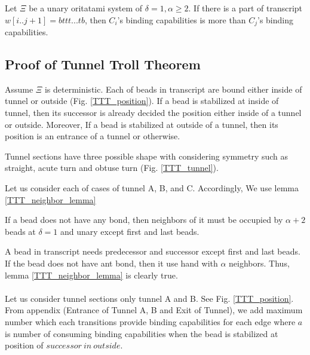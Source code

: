 \documentclass[runningheads]{llncs}
\begin{document}
\begin{theorem}
  Let $\Xi$ be a unary oritatami system of $\delta = 1, \alpha \geq 2$. If there is a part of transcript $w[i..j+1] = bttt...tb$, then $C_i$'s binding capabilities is more than $C_j$'s binding capabilities.
\end{theorem}



\subsection{Proof of Tunnel Troll Theorem}
Assume $\Xi$ is deterministic. %
Each of beads in transcript are bound either inside of tunnel or outside (Fig. \ref{TTT_position}). If a bead is stabilized at inside of tunnel, then its successor is already decided the position either inside of a tunnel or outside. Moreover, If a bead is stabilized at outside of a tunnel, then its position is an entrance of a tunnel or otherwise.

Tunnel sections have three possible shape with considering symmetry such as straight, acute turn and obtuse turn (Fig. \ref{TTT_tunnel}). %

Let us consider each of cases of tunnel A, B, and C. Accordingly, We use lemma \ref{TTT_neighbor_lemma}

\begin{lemma}
\label{TTT_neighbor_lemma}
If a bead does not have any bond, then neighbors of it must be occupied by $\alpha + 2$ beads at $\delta = 1$ and unary except first and last beads.
\end{lemma}

A bead in transcript needs predecessor and successor except first and last beads. If the bead does not have ant bond, then it use hand with $\alpha$ neighbors. Thus, lemma \ref{TTT_neighbor_lemma} is clearly true.

\paragraph{}
Let us consider tunnel sections only tunnel A and B. See Fig. \ref{TTT_position}. From appendix (Entrance of Tunnel A, B and Exit of Tunnel), we add maximum number which each transitions provide binding capabilities for each edge where $a$ is number of consuming binding capabilities when the bead is stabilized at position of $successor\ in\ outside$.
\end{document}
